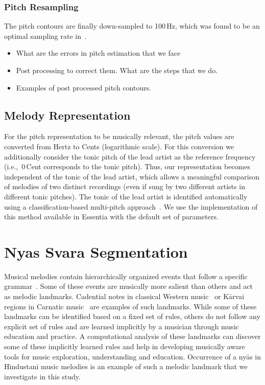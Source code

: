 {{\subsubsection{Pitch Resampling}
\label{sec:data_processing_pitch_resampling}


The pitch contours are finally down-sampled to 100\,Hz, which was found to be an optimal sampling rate in~\cite{gulati_ICASSP2015}. 

\begin{itemize}
	\item What are the errors in pitch estimation that we face
	\item Post processing to correct them. What are the steps that we do.
	\item Examples of post processed pitch contours.
\end{itemize}


\subsection{Melody Representation} 

For the pitch representation to be musically relevant, the pitch values are converted from Hertz to Cents (logarithmic scale). For this conversion we additionally consider the tonic pitch of the lead artist as the reference frequency (i.e.,~0\,Cent corresponds to the tonic pitch). Thus, our representation becomes independent of the tonic of the lead artist, which allows a meaningful comparison of melodies of two distinct recordings (even if sung by two different artists in different tonic pitches). The tonic of the lead artist is identified automatically using a classification-based multi-pitch approach~\cite{Gulati2014Tonic}. We use the implementation of this method available in Essentia with the default set of parameters.%


\section{Nyas Svara Segmentation}
\label{sec:pre_processing_nyas_segmentation}

Musical melodies contain hierarchically organized events that follow a specific grammar~\cite{Patel07BOOK}. Some of these events are musically more salient than others and act as melodic landmarks. Cadential notes in classical Western music~\cite{GroveCadence} or K\={a}rvai regions in Carnatic music~\cite{sambamoorthy:1998} are examples of such landmarks. While some of these landmarks can be identified based on a fixed set of rules, others do not follow any explicit set of rules and are learned implicitly by a musician through music education and practice. A computational analysis of these landmarks can discover some of these implicitly learned rules and help in developing musically aware tools for music exploration, understanding and education. Occurrence of a ny\={a}s in Hindustani music melodies is an example of such a melodic landmark that we investigate in this study. 

}}

